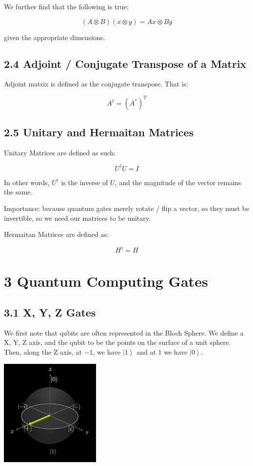 \documentclass[10pt,oneside,a4paper]{article}
\newcommand{\qb}[1]{\left| #1 \right\rangle}
\begin{document}
We further find that the following is true: 

\[ 
    (A \otimes B) (x \otimes y) = Ax \otimes By 
\]

given the appropriate dimensions. 

\subsection*{2.4 Adjoint / Conjugate Transpose of a Matrix}

Adjoint matrix is defined as the conjugate transpose. That is: 

\[ 
    A^{\dagger} = {(A^*)}^T
\]

\subsection*{2.5 Unitary and Hermaitan Matrices}
Unitary Matrices are defined as such: 

\[ 
    U^{\dagger} U = I 
\]

In other words, $U^{\dagger}$ is the inverse of $U$, and the magnitude of the vector remains the same. 

Importance: because quantum gates merely rotate / flip a vector, so they must be invertible, so we need our matrices to be unitary.

Hermaitan Matrices are defined as: 

\[ 
    H^{\dagger} = H
\]

\section*{3 Quantum Computing Gates}

\subsection*{3.1 X, Y, Z Gates}

We first note that qubits are often represented in the Bloch Sphere. We define a X, Y, Z axis, and the qubit to be the points on the surface of a unit sphere. Then, along the Z axis, at $-1$, we have $\qb{1}$ and at $1$ we have $\qb{0}$. 

\includegraphics[width=5cm]{1}
\end{document}
